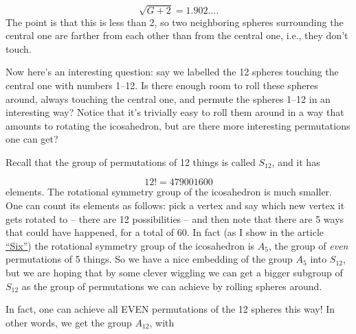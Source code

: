 \[ \sqrt{G + 2} =  1.902....\]
The point is that this is less than 2, so two neighboring spheres surrounding the central one are farther from each other than from the central one, i.e., they don't touch.

Now here's an interesting question: say we labelled the 12 spheres touching the central one with numbers 1--12. Is there enough room to roll these spheres around, always touching the central one, and permute the spheres 1--12 in an interesting way? Notice that it's trivially easy to roll them around in a way that amounts to rotating the icosahedron, but are there more interesting permutations one can get?

Recall that the group of permutations of 12 things is called $S_{12}$, and it has

\[ 12! = 479001600\]
elements. The rotational symmetry group of the icosahedron is much smaller. One can count its elements as follows: pick a vertex and say which new vertex it gets rotated to -- there are 12 possibilities -- and then note that there are 5 ways that could have happened, for a total of 60. In fact (as I show in the article \href{http://math.ucr.edu/home/baez/six.html}{``Six''}) the rotational symmetry group of the icosahedron is $A_5$, the group of \emph{even} permutations of 5 things. So we have a nice embedding of the group $A_5$ into $S_{12}$, but we are hoping that by some clever wiggling we can get a bigger subgroup of $S_{12}$ as the group of permutations we can achieve by rolling spheres around.

In fact, one can achieve all EVEN permutations of the 12 spheres this way! In other words, we get the group $A_{12}$, with

